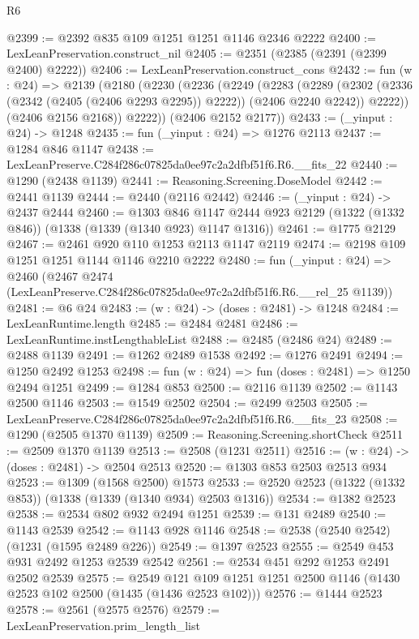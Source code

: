 \begin{lexlean}{R6}
\begin{coremodule}
@2399 := @2392 @835 @109 @1251 @1251 @1146 @2346 @2222
@2400 := LexLeanPreservation.construct_nil
@2405 := @2351 (@2385 (@2391 (@2399 @2400) @2222))
@2406 := LexLeanPreservation.construct_cons
@2432 := fun (w : @24) =>
  @2139
    (@2180
      (@2230
        (@2236
          (@2249
            (@2283
              (@2289
                (@2302 (@2336 (@2342 (@2405 (@2406 @2293 @2295)) @2222)) (@2406 @2240 @2242))
                @2222))
            (@2406 @2156 @2168))
          @2222))
      (@2406 @2152 @2177))
@2433 := (_yinput : @24) -> @1248
@2435 := fun (_yinput : @24) => @1276 @2113
@2437 := @1284 @846 @1147
@2438 := LexLeanPreserve.C284f286c07825da0ee97c2a2dfbf51f6.R6.__fits_22
@2440 := @1290 (@2438 @1139)
@2441 := Reasoning.Screening.DoseModel
@2442 := @2441 @1139
@2444 := @2440 (@2116 @2442)
@2446 := (_yinput : @24) -> @2437 @2444
@2460 := @1303
    @846
    @1147
    @2444
    @923
    @2129
    (@1322 (@1332 @846))
    (@1338 (@1339 (@1340 @923) @1147 @1316))
@2461 := @1775 @2129
@2467 := @2461 @920 @110 @1253 @2113 @1147 @2119
@2474 := @2198 @109 @1251 @1251 @1144 @1146 @2210 @2222
@2480 := fun (_yinput : @24) =>
  @2460 (@2467 @2474 (LexLeanPreserve.C284f286c07825da0ee97c2a2dfbf51f6.R6.__rel_25 @1139))
@2481 := @6 @24
@2483 := (w : @24) -> (doses : @2481) -> @1248
@2484 := LexLeanRuntime.length
@2485 := @2484 @2481
@2486 := LexLeanRuntime.instLengthableList
@2488 := @2485 (@2486 @24)
@2489 := @2488 @1139
@2491 := @1262 @2489 @1538
@2492 := @1276 @2491
@2494 := @1250 @2492 @1253
@2498 := fun (w : @24) => fun (doses : @2481) => @1250 @2494 @1251
@2499 := @1284 @853
@2500 := @2116 @1139
@2502 := @1143 @2500 @1146
@2503 := @1549 @2502
@2504 := @2499 @2503
@2505 := LexLeanPreserve.C284f286c07825da0ee97c2a2dfbf51f6.R6.__fits_23
@2508 := @1290 (@2505 @1370 @1139)
@2509 := Reasoning.Screening.shortCheck
@2511 := @2509 @1370 @1139
@2513 := @2508 (@1231 @2511)
@2516 := (w : @24) -> (doses : @2481) -> @2504 @2513
@2520 := @1303 @853 @2503 @2513 @934
@2523 := @1309 (@1568 @2500) @1573
@2533 := @2520 @2523 (@1322 (@1332 @853)) (@1338 (@1339 (@1340 @934) @2503 @1316))
@2534 := @1382 @2523
@2538 := @2534 @802 @932 @2494 @1251
@2539 := @131 @2489
@2540 := @1143 @2539
@2542 := @1143 @928 @1146
@2548 := @2538 (@2540 @2542) (@1231 (@1595 @2489 @226))
@2549 := @1397 @2523
@2555 := @2549 @453 @931 @2492 @1253 @2539 @2542
@2561 := @2534 @451 @292 @1253 @2491 @2502 @2539
@2575 := @2549 @121 @109 @1251 @1251 @2500 @1146 (@1430 @2523 @102 @2500 (@1435 (@1436 @2523 @102)))
@2576 := @1444 @2523
@2578 := @2561 (@2575 @2576)
@2579 := LexLeanPreservation.prim_length_list

\end{coremodule}
\end{lexlean}
